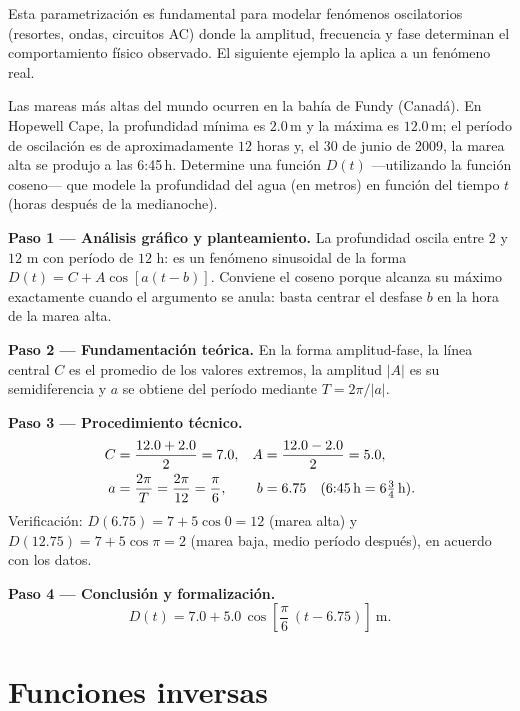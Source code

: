 Esta parametrización es fundamental para modelar fenómenos oscilatorios (resortes, ondas, circuitos AC) donde la amplitud, frecuencia y fase determinan el comportamiento físico observado. El siguiente ejemplo la aplica a un fenómeno real.

\begin{example}
Las mareas más altas del mundo ocurren en la bahía de Fundy (Canadá). En
Hopewell Cape, la profundidad mínima es $2.0\,\mathrm{m}$ y la máxima es
$12.0\,\mathrm{m}$; el período de oscilación es de aproximadamente $12$
horas y, el 30 de junio de 2009, la marea alta se produjo a las 6:45\,h.
Determine una función $D(t)$ ---utilizando la función coseno--- que modele
la profundidad del agua (en metros) en función del tiempo $t$ (horas
después de la medianoche).

\begin{myproof}
\textbf{Paso 1 — Análisis gráfico y planteamiento.}
La profundidad oscila entre $2$ y $12$ m con período de $12$ h: es un
fenómeno sinusoidal de la forma $D(t) = C + A\cos[a(t-b)]$. Conviene el
coseno porque alcanza su máximo exactamente cuando el argumento se anula:
basta centrar el desfase $b$ en la hora de la marea alta.

\textbf{Paso 2 — Fundamentación teórica.}
En la forma amplitud-fase, la línea central $C$ es el promedio de los
valores extremos, la amplitud $|A|$ es su semidiferencia y $a$ se obtiene
del período mediante $T = 2\pi/|a|$.

\textbf{Paso 3 — Procedimiento técnico.}
\begin{align*}
  C &= \frac{12.0 + 2.0}{2} = 7.0, &
  A &= \frac{12.0 - 2.0}{2} = 5.0,\\
  a &= \frac{2\pi}{T} = \frac{2\pi}{12} = \frac{\pi}{6}, &
  b &= 6.75 \quad (\text{6:45\,h} = 6\tfrac{3}{4}\,\mathrm{h}).
\end{align*}
Verificación: $D(6.75) = 7 + 5\cos 0 = 12$ (marea alta) y
$D(12.75) = 7 + 5\cos\pi = 2$ (marea baja, medio período después), en
acuerdo con los datos.

\textbf{Paso 4 — Conclusión y formalización.}
\[
  \boxed{D(t) = 7.0 + 5.0\,\cos\!\left[\frac{\pi}{6}\,(t - 6.75)\right]
  \ \mathrm{m}.}
\]
\end{myproof}
\end{example}

\section{Funciones inversas}

